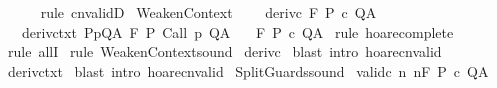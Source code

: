 \begin{isabellebody}
\ \ \ \ \isamarkupfalse%
\ {\isacharparenleft}rule\ cnvalidD{\isacharparenright}\isanewline
{}\isamarkupfalse%
%
\endisatagproof
{\isafoldproof}%
%
\isadelimproof
\isanewline
%
\endisadelimproof
\isanewline
{}\isamarkupfalse%
\ WeakenContext{\isacharcolon}\ \isanewline
\ \ \ deriv{\isacharunderscore}c{\isacharcolon}\ {\isachardoublequoteopen}{\isasymGamma}{\isacharcomma}{\isasymTheta}{\isacharprime}{\isasymturnstile}\isactrlbsub {\isacharslash}F\isactrlesub \ P\ c\ Q{\isacharcomma}A{\isachardoublequoteclose}\ \isanewline
\ \ \ deriv{\isacharunderscore}ctxt{\isacharcolon}\ {\isachardoublequoteopen}{\isasymforall}{\isacharparenleft}P{\isacharcomma}p{\isacharcomma}Q{\isacharcomma}A{\isacharparenright}{\isasymin}{\isasymTheta}{\isacharprime}{\isachardot}\ {\isasymGamma}{\isacharcomma}{\isasymTheta}{\isasymturnstile}\isactrlbsub {\isacharslash}F\isactrlesub \ P\ {\isacharparenleft}Call\ p{\isacharparenright}\ Q{\isacharcomma}A{\isachardoublequoteclose}\isanewline
\ \ \ {\isachardoublequoteopen}{\isasymGamma}{\isacharcomma}{\isasymTheta}{\isasymturnstile}\isactrlbsub {\isacharslash}F\isactrlesub \ P\ c\ Q{\isacharcomma}A{\isachardoublequoteclose}\isanewline
%
\isadelimproof
%
\endisadelimproof
%
\isatagproof
{}\isamarkupfalse%
\ {\isacharparenleft}rule\ hoare{\isacharunderscore}complete{\isacharprime}{\isacharparenright}\isanewline
{}\isamarkupfalse%
\ {\isacharparenleft}rule\ allI{\isacharparenright}\isanewline
{}\isamarkupfalse%
\ {\isacharparenleft}rule\ WeakenContext{\isacharunderscore}sound{\isacharparenright}\isanewline
{}\isamarkupfalse%
\ deriv{\isacharunderscore}c\isanewline
{}\isamarkupfalse%
\ {\isacharparenleft}blast\ intro{\isacharcolon}\ hoare{\isacharunderscore}cnvalid{\isacharparenright}\isanewline
{}\isamarkupfalse%
\ deriv{\isacharunderscore}ctxt\isanewline
{}\isamarkupfalse%
\ {\isacharparenleft}blast\ intro{\isacharcolon}\ hoare{\isacharunderscore}cnvalid{\isacharparenright}\isanewline
{}\isamarkupfalse%
%
\endisatagproof
{\isafoldproof}%
%
\isadelimproof
%
\endisadelimproof
%
\isamarkuptrue%
\isamarkupfalse%
\ SplitGuards{\isacharunderscore}sound{\isacharcolon}\isanewline
{}\ valid{\isacharunderscore}c{}{\isacharcolon}\ {\isachardoublequoteopen}{\isasymforall}n{\isachardot}\ {\isasymGamma}{\isacharcomma}{\isasymTheta}{\isasymTurnstile}n{\isacharcolon}\isactrlbsub {\isacharslash}F\isactrlesub \ P\ c\ Q{\isacharcomma}A{\isachardoublequoteclose}\isanewline

\end{isabellebody}

